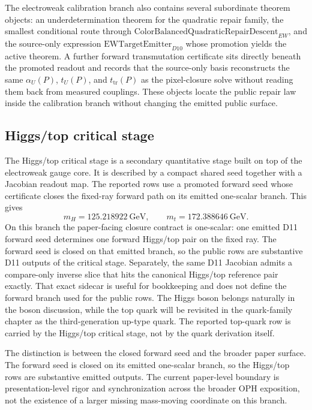 \documentclass[11pt]{article}
\begin{document}
The electroweak calibration branch also contains several subordinate theorem objects: an
underdetermination theorem for the quadratic repair family, the smallest conditional route
through \(\mathrm{ColorBalancedQuadraticRepairDescent}_{EW}\), and the source-only expression
\(\mathrm{EWTargetEmitter}_{D10}\) whose promotion yields the active theorem. A further forward transmutation certificate sits directly beneath the promoted readout and records that the source-only basis reconstructs the same \(\alpha_U(P)\), \(t_U(P)\), and \(t_{\mathrm{tr}}(P)\) as the pixel-closure solve without reading them back from measured couplings. These objects locate
the public repair law inside the calibration branch without changing the emitted public surface.

\subsection{Higgs/top critical stage}

The Higgs/top critical stage is a secondary quantitative stage built on top of the electroweak gauge core.
It is described by a compact shared seed together with a Jacobian readout map. The reported
rows use a promoted forward seed whose certificate closes the fixed-ray forward
path on its emitted one-scalar branch. This gives
\[
m_H = 125.218922~\mathrm{GeV},
\qquad
m_t = 172.388646~\mathrm{GeV}.
\]
On this branch the paper-facing closure contract is one-scalar: one emitted D11 forward seed determines one forward Higgs/top pair on the fixed ray. The forward seed is closed on that emitted branch, so the public rows are substantive D11 outputs of the critical stage.
Separately, the same D11 Jacobian admits a compare-only inverse slice that hits the canonical
Higgs/top reference pair exactly. That exact sidecar is useful for bookkeeping and does not define
the forward branch used for the public rows.
The Higgs boson belongs naturally in the boson discussion, while the top quark will be revisited
in the quark-family chapter as the third-generation up-type quark. The reported top-quark row is
carried by the Higgs/top critical stage, not by the quark derivation itself.

The distinction is between the closed forward seed and the broader paper surface. The
forward seed is closed on its emitted one-scalar branch, so the Higgs/top rows are
substantive emitted outputs. The current paper-level boundary is presentation-level rigor and synchronization
across the broader OPH exposition, not the existence of a larger missing mass-moving
coordinate on this branch.
\end{document}
